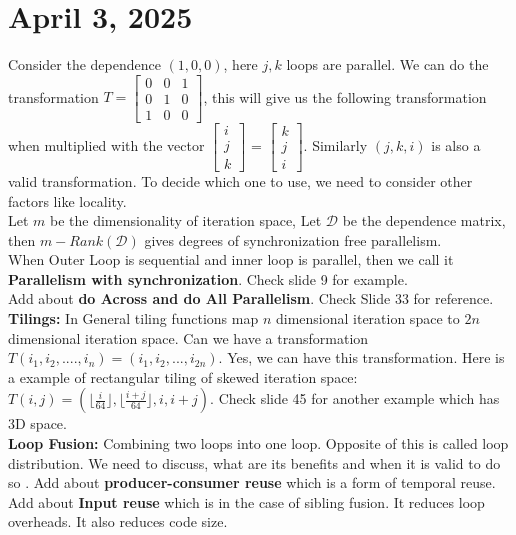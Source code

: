 \documentclass{article}
\begin{document}
\newpage
\section*{April 3, 2025}

Consider the dependence $(1,0,0)$, here $j,k$ loops are parallel. We can do the transformation $T = \begin{bmatrix}
    0 & 0 & 1 \\
    0 & 1 & 0 \\
    1 & 0 & 0
\end{bmatrix}$, this will give us the following transformation when multiplied with the vector $\begin{bmatrix}
    i \\ j \\ k
\end{bmatrix}$ = $\begin{bmatrix}
    k \\ j \\ i
    \end{bmatrix}$. Similarly $(j,k,i)$ is also a valid transformation. To decide which one to use, we need to consider other factors like locality. \\

Let $m$ be the dimensionality of iteration space, Let $\mathcal{D}$ be the dependence matrix, then $m - Rank(\mathcal{D})$ gives degrees of synchronization free parallelism. \\

When Outer Loop is sequential and inner loop is parallel, then we call it \textbf{Parallelism with synchronization}. Check slide 9 for example. \\
Add about \textbf{do Across and do All Parallelism}. Check Slide 33 for reference. \\

\textbf{Tilings: } In General tiling functions map $n$ dimensional iteration space to $2n$ dimensional iteration space. Can we have a transformation $T(i_1,i_2,....,i_n) = (i_1,i_2,...,i_{2n})$. Yes, we can have this transformation. Here is a example of rectangular tiling of skewed iteration space: \\
$\boxed{T(i,j) = (\lfloor \frac{i}{64} \rfloor, \lfloor \frac{i+j}{64} \rfloor, i, i+j)}$. Check slide 45 for another example which has 3D space. \\

\textbf{Loop Fusion: } Combining two loops into one loop. Opposite of this is called loop distribution. We need to discuss, what are its benefits and when it is valid to do so . Add about \textbf{producer-consumer reuse} which is a form of temporal reuse. Add about \textbf{Input reuse} which is in the case of sibling fusion. It reduces loop overheads. It also reduces code size. \\
\end{document}

